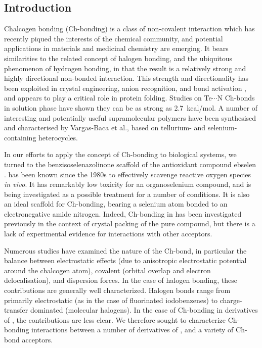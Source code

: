 \begin{refsection}
\section{Introduction}
Chalcogen bonding (Ch-bonding) is a class of non-covalent interaction which has recently piqued the interests of the chemical community, and potential applications in materials and medicinal chemistry are emerging.\autocite{Mitchell2017,Wonner2017a,Fanfrlik2014,Vogel2019}
It bears similarities to the related concept of halogen bonding, and the ubiquitous phenomenon of hydrogen bonding, in that the result is a relatively strong and highly directional non-bonded interaction.\autocite{Paolo1974}
This strength and directionality has been exploited in crystal engineering\autocite{Gleiter2003,Kremer2016,Huynh2017}, anion recognition\autocite{Lim2017,Lim2018,Garrett2016}, and bond activation \autocite{Wonner2017,Benz2017,Benz2017a}, and appears to play a critical role in protein folding\autocite{Iwaoka2001,Iwaoka2015}.
Studies on Te$\cdots$N Ch-bonds in solution phase have shown they can be as strong as 2.7~kcal/mol\autocite{Garrett2015a}.
A number of interesting and potentially useful supramolecular polymers have been synthesised and characterised by Vargas-Baca et al., based on tellurium- and selenium-containing heterocycles\autocite{Ho2016,Ho2017}.

In our efforts to apply the concept of Ch-bonding to biological systems, we turned to the benzisoselenazolinone scaffold of the antioxidant compound ebselen .
 has been known since the 1980s to effectively scavenge reactive oxygen species \emph{in vivo}.\autocite{Muller1984}
It has remarkably low toxicity for an organoselenium compound, and is being investigated as a possible treatment for a number of conditions.\autocite{Schewe1995,Kil2007,Singh2013,Parnham2000}
It is also an ideal scaffold for Ch-bonding, bearing a selenium atom bonded to an electronegative amide nitrogen.
Indeed, Ch-bonding in  has been investigated previously in the context of crystal packing of the pure compound, but there is a lack of experimental evidence for interactions with other acceptors.\autocite{Thomas2015}

Numerous studies have examined the nature of the Ch-bond, in particular the balance between electrostatic effects (due to anisotropic electrostatic potential around the chalcogen atom), covalent (orbital overlap and electron delocalisation), and dispersion forces.\autocite{Oliveira2017,Pascoe2017,DeVleeschouwer2017,Kolar2016,Gleiter2018}
In the case of halogen bonding, these contributions are generally well characterized.
Halogen bonds range from primarily electrostatic (as in the case of fluorinated iodobenzenes\autocite{Prasang2009}) to charge-transfer dominated (molecular halogens\autocite{Mulliken1950}).
In the case of Ch-bonding in derivatives of , the contributions are less clear.
We therefore sought to characterize Ch-bonding interactions between a number of derivatives of , and a variety of Ch-bond acceptors.



\end{refsection}

